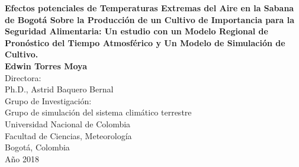 
\newpage{\pagestyle{empty}\cleardoublepage}

\newpage
\begin{center}
\thispagestyle{empty} \vspace*{0cm} \textbf{\huge Efectos potenciales de Temperaturas Extremas del Aire en la Sabana de Bogotá Sobre la Producción de un Cultivo de Importancia para la Seguridad Alimentaria: Un estudio con un Modelo Regional de Pronóstico del Tiempo Atmosférico y Un Modelo de Simulación de Cultivo. }\\[3.0cm]
\Large\textbf{Edwin Torres Moya}\\[3.0cm]
Directora:\\
Ph.D., Astrid Baquero Bernal\\[2.0cm]
Grupo de Investigaci\'{o}n:\\
Grupo de simulación del sistema climático terrestre\\[2.5cm]
Universidad Nacional de Colombia\\
Facultad de Ciencias, Meteorología\\
Bogotá, Colombia\\
A\~{n}o 2018\\
\end{center}
